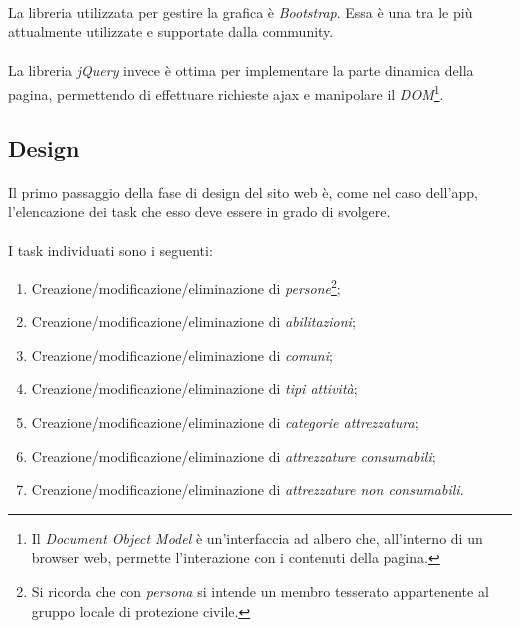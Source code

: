 \documentclass[11pt,a4paper,english]{article}
\begin{document}
\paragraph{} La libreria utilizzata per gestire la grafica è \emph{Bootstrap}. Essa è una tra le più attualmente utilizzate e supportate dalla community.

\paragraph{} La libreria \emph{jQuery} invece è ottima per implementare la parte dinamica della pagina, permettendo di effettuare richieste ajax e manipolare il \emph{DOM}\footnote{Il \emph{Document Object Model} è un'interfaccia ad albero che, all'interno di un browser web, permette l'interazione con i contenuti della pagina.}.


\subsection{Design}

\paragraph{} Il primo passaggio della fase di design del sito web è, come nel caso dell'app, l'elencazione dei task che esso deve essere in grado di svolgere. 

\paragraph{} I task individuati sono i seguenti:
\begin{enumerate}
    \item Creazione/modificazione/eliminazione di \emph{persone}\footnote{Si ricorda che con \emph{persona} si intende un membro tesserato appartenente al gruppo locale di protezione civile.};
    \item Creazione/modificazione/eliminazione di \emph{abilitazioni};
    \item Creazione/modificazione/eliminazione di \emph{comuni};
    \item Creazione/modificazione/eliminazione di \emph{tipi attività};
    \item Creazione/modificazione/eliminazione di \emph{categorie attrezzatura};
    \item Creazione/modificazione/eliminazione di \emph{attrezzature consumabili};
    \item Creazione/modificazione/eliminazione di \emph{attrezzature non consumabili}.
\end{enumerate}
\end{document}
